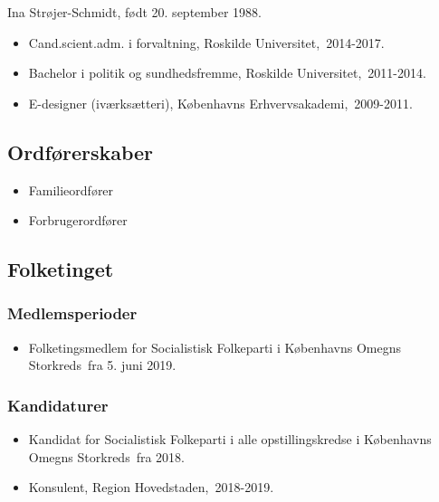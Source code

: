 \documentclass[11pt, a4paper]{awesome-cv}
\begin{document}
\makecvheader[R]
\makelettertitle
\begin{cvletter}
Ina Strøjer-Schmidt, født 20. september 1988.

\begin{itemize}
\item Cand.scient.adm. i forvaltning, Roskilde Universitet, 2014-2017.
\item Bachelor i politik og sundhedsfremme, Roskilde Universitet, 2011-2014.
\item E-designer (iværksætteri), Københavns Erhvervsakademi, 2009-2011.
\end{itemize}
\subsection*{Ordførerskaber}
\begin{itemize}
\item Familieordfører
\item Forbrugerordfører
\end{itemize}
\subsection*{Folketinget}
\subsubsection*{Medlemsperioder}
\begin{itemize}
\item Folketingsmedlem for Socialistisk Folkeparti i Københavns Omegns Storkreds fra 5. juni 2019.
\end{itemize}
\subsubsection*{Kandidaturer}
\begin{itemize}
\item Kandidat for Socialistisk Folkeparti i alle opstillingskredse i Københavns Omegns Storkreds fra 2018.
\end{itemize}
\begin{itemize}
\item Konsulent, Region Hovedstaden, 2018-2019.
\end{itemize}
\end{cvletter}
\end{document}
